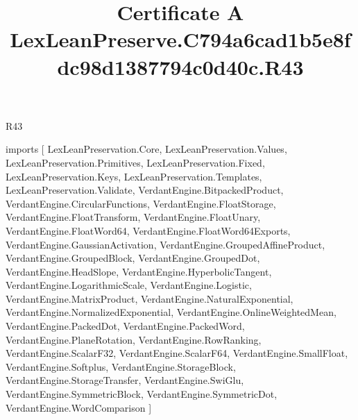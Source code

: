 \begin{lexlean}{R43}
\title{Certificate A LexLeanPreserve.C794a6cad1b5e8fdc98d1387794c0d40c.R43}
\begin{coremodule}
imports [
  LexLeanPreservation.Core,
  LexLeanPreservation.Values,
  LexLeanPreservation.Primitives,
  LexLeanPreservation.Fixed,
  LexLeanPreservation.Keys,
  LexLeanPreservation.Templates,
  LexLeanPreservation.Validate,
  VerdantEngine.BitpackedProduct,
  VerdantEngine.CircularFunctions,
  VerdantEngine.FloatStorage,
  VerdantEngine.FloatTransform,
  VerdantEngine.FloatUnary,
  VerdantEngine.FloatWord64,
  VerdantEngine.FloatWord64Exports,
  VerdantEngine.GaussianActivation,
  VerdantEngine.GroupedAffineProduct,
  VerdantEngine.GroupedBlock,
  VerdantEngine.GroupedDot,
  VerdantEngine.HeadSlope,
  VerdantEngine.HyperbolicTangent,
  VerdantEngine.LogarithmicScale,
  VerdantEngine.Logistic,
  VerdantEngine.MatrixProduct,
  VerdantEngine.NaturalExponential,
  VerdantEngine.NormalizedExponential,
  VerdantEngine.OnlineWeightedMean,
  VerdantEngine.PackedDot,
  VerdantEngine.PackedWord,
  VerdantEngine.PlaneRotation,
  VerdantEngine.RowRanking,
  VerdantEngine.ScalarF32,
  VerdantEngine.ScalarF64,
  VerdantEngine.SmallFloat,
  VerdantEngine.Softplus,
  VerdantEngine.StorageBlock,
  VerdantEngine.StorageTransfer,
  VerdantEngine.SwiGlu,
  VerdantEngine.SymmetricBlock,
  VerdantEngine.SymmetricDot,
  VerdantEngine.WordComparison
]


\end{coremodule}
\end{lexlean}
